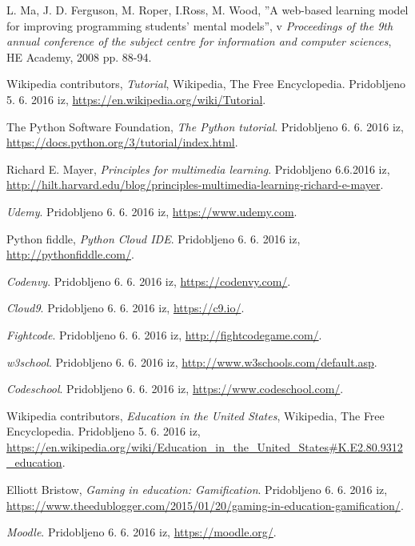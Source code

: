 \begin{thebibliography}{100}
 L. Ma, J. D. Ferguson, M. Roper, I.Ross, M. Wood,
  ''A web-based learning model for improving programming students' mental
  models'', v \emph{Proceedings of the 9th annual conference of the subject
  centre for information and computer sciences}, HE Academy, 2008
  pp. 88-94.

 Wikipedia contributors, \emph{Tutorial},
  Wikipedia, The Free Encyclopedia. Pridobljeno 5. 6. 2016 iz,
  \url{https://en.wikipedia.org/wiki/Tutorial}.

 The Python Software Foundation, \emph{The
    Python tutorial}. Pridobljeno 6. 6. 2016 iz,
  \url{https://docs.python.org/3/tutorial/index.html}.

 Richard E. Mayer, \emph{Principles for multimedia learning}. Pridobljeno 6.6.2016 iz,
  \url{http://hilt.harvard.edu/blog/principles-multimedia-learning-richard-e-mayer}.

 \emph{Udemy}. Pridobljeno 6. 6. 2016 iz,
  \url{https://www.udemy.com}.

 Python fiddle, \emph{Python Cloud
    IDE}. Pridobljeno 6. 6. 2016 iz,
  \url{http://pythonfiddle.com/}.

 \emph{Codenvy}. Pridobljeno 6. 6. 2016 iz,
  \url{https://codenvy.com/}.

 \emph{Cloud9}. Pridobljeno 6. 6. 2016 iz,
  \url{https://c9.io/}.

 \emph{Fightcode}. Pridobljeno 6. 6. 2016 iz,
  \url{http://fightcodegame.com/}.

 \emph{w3school}. Pridobljeno 6. 6. 2016 iz,
  \url{http://www.w3schools.com/default.asp}.

 \emph{Codeschool}. Pridobljeno 6. 6. 2016 iz,
  \url{https://www.codeschool.com/}.

 Wikipedia contributors, \emph{Education in the
    United States}, Wikipedia, The Free Encyclopedia. Pridobljeno
  5. 6. 2016 iz,
  \url{https://en.wikipedia.org/wiki/Education_in_the_United_States#K.E2.80.9312_education}.

 Elliott Bristow, \emph{Gaming in education: Gamification}. Pridobljeno 6. 6. 2016 iz,
  \url{https://www.theedublogger.com/2015/01/20/gaming-in-education-gamification/}.

 \emph{Moodle}. Pridobljeno 6. 6. 2016 iz,
  \url{https://moodle.org/}.


\end{thebibliography}
